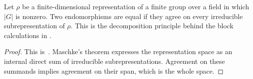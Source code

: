 \begin{lemma}
    \label{thm:peps_irreducible_ext}
    \leanok
    Let $\rho$ be a finite-dimensional representation of a finite group
    over a field in which $|G|$ is nonzero. Two endomorphisms are equal
    if they agree on every irreducible subrepresentation of $\rho$.
    This is the decomposition principle behind the block calculations
    in \cite[Lemma~4.4]{Schuch2010PEPS}.
\end{lemma}
\begin{proof}\leanok
    This is~\cite[``Equality on irreducible summands'']{QICLean2026Blueprint}.
    Maschke's theorem expresses the representation space as an internal
    direct sum of irreducible subrepresentations. Agreement on these
    summands implies agreement on their span, which is the whole space.
\end{proof}
